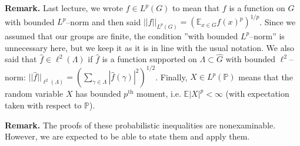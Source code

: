 \documentclass{article}
\theoremstyle{definition}
\begin{document}
\textbf{Remark.} Last lecture, we wrote $f \in L^p(G)$ to mean that $f$ is a function on $G$ with bounded $L^p$--norm and then said $||f||_{L^p(G)} = \left(\mathbb{E}_{x \in G} f(x)^{p}\right)^{1/p}$. Since we assumed that our groups are finite, the condition ''with bounded $L^p$--norm'' is unnecessary here, but we keep it as it is in line with the usual notation. We also said that $\widehat{f} \in \ell^2(\Lambda)$ if $\widehat{f}$ is a function supported on $\Lambda \subset \widehat{G}$ with bounded $\ell^2$--norm: $||\widehat{f}||_{\ell^2(\Lambda)} = \left(\sum_{\gamma \in \Lambda}^{} \left|\widehat{f}(\gamma)\right|^2\right)^{1/2}$. Finally, $X \in L^p(\mathbb{P})$ means that the random variable $X$ has bounded $p^{\text{th}}$ moment, i.e. $\mathbb{E}\left|X\right|^p<\infty$ (with expectation taken with respect to $\mathbb{P}$).
\vspace{1mm}
 
\textbf{Remark.} The proofs of these probabilistic inequalities are nonexaminable. However, we are expected to be able to state them and apply them.  
\vspace{1mm}
 
\end{document}
